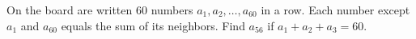 On the board are written $60$ numbers $a_{1}, a_{2}, \ldots, a_{60}$ in a row. Each number except $a_{1}$ and $a_{60}$ equals the sum of its neighbors. Find $a_{56}$ if $a_{1}+a_{2}+a_{3}=60$.
